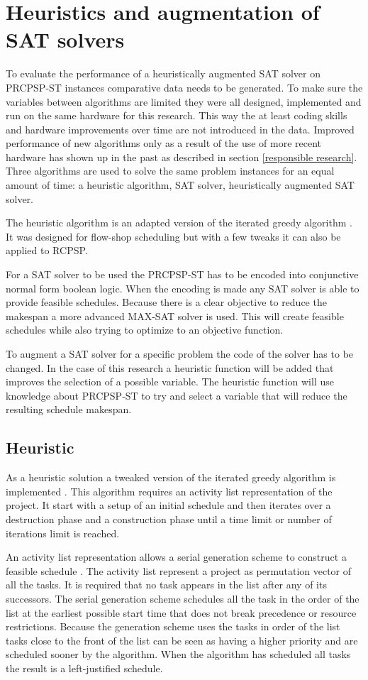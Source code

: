 \section{Heuristics and augmentation of SAT solvers}
To evaluate the performance of a heuristically augmented SAT solver on PRCPSP-ST instances comparative data needs to be generated.  To make sure the variables between algorithms are limited they were all designed, implemented and run on the same hardware for this research. This way the at least coding skills and hardware improvements over time are not introduced in the data. Improved performance of new algorithms only as a result of the use of more recent hardware has shown up in the past as described in section \ref{responsible research}. Three algorithms are used to solve the same problem instances for an equal amount of time: a heuristic algorithm, SAT solver, heuristically augmented SAT solver.

The heuristic algorithm is an adapted version of the iterated greedy algorithm \cite{RN32}. It was designed for flow-shop scheduling but with a few tweaks it can also be applied to RCPSP.

For a SAT solver to be used the PRCPSP-ST has to be encoded into conjunctive normal form boolean logic. When the encoding is made any SAT solver is able to provide feasible schedules. Because there is a clear objective to reduce the makespan a more advanced MAX-SAT solver is used. This will create feasible schedules while also trying to optimize to an objective function.

To augment a SAT solver for a specific problem the code of the solver has to be changed. In the case of this research a heuristic function will be added that improves the selection of a possible variable. The heuristic function will use knowledge about PRCPSP-ST to try and select a variable that will reduce the resulting schedule makespan.

\subsection{Heuristic}
As a heuristic solution a tweaked version of the iterated greedy algorithm is implemented \cite{RN32}. This algorithm requires an activity list representation of the project. It start with a setup of an initial schedule and then iterates over a destruction phase and a construction phase until a time limit or number of iterations limit is reached. 

An activity list representation allows a serial generation scheme to construct a feasible schedule \cite{RN46}. The activity list represent a project as permutation vector of all the tasks. It is required that no task appears in the list after any of its successors. The serial generation scheme schedules all the task in the order of the list at the earliest possible start time that does not break precedence or resource restrictions. Because the generation scheme uses the tasks in order of the list tasks close to the front of the list can be seen as having a higher priority and are scheduled sooner by the algorithm. When the algorithm has scheduled all tasks the result is a left-justified schedule.

